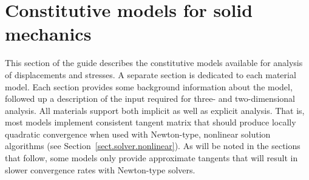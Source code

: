 \section{Constitutive models for solid mechanics}
\label{sect.model.solids}
This section of the guide describes the constitutive models available 
for analysis of displacements and stresses. A separate section is 
dedicated to each material model. Each section provides some 
background information about the model, followed up a description of 
the input required for three- and two-dimensional analysis.
All materials support both implicit as well as explicit 
analysis. That is, most models implement consistent tangent matrix 
that should produce locally quadratic convergence when used with 
Newton-type, nonlinear solution algorithms 
(see Section~\ref{sect.solver.nonlinear}).
As will be noted in the sections that follow, some models only provide 
approximate tangents that will result in
slower convergence rates with Newton-type solvers.
